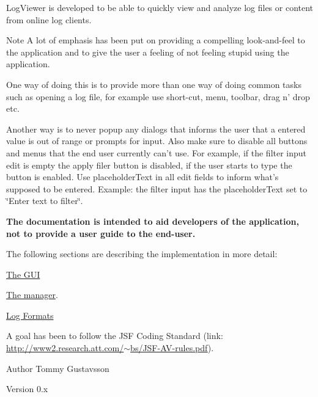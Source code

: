 Log\-Viewer is developed to be able to quickly view and analyze log files or content from online log clients.

\begin{DoxyNote}{Note}
A lot of emphasis has been put on providing a compelling look-\/and-\/feel to the application and to give the user a feeling of not feeling stupid using the application.

One way of doing this is to provide more than one way of doing common tasks such as opening a log file, for example use short-\/cut, menu, toolbar, drag n' drop etc.

Another way is to never popup any dialogs that informs the user that a entered value is out of range or prompts for input. Also make sure to disable all buttons and menus that the end user currently can't use. For example, if the filter input edit is empty the apply filer button is disabled, if the user starts to type the button is enabled. Use placeholder\-Text in all edit fields to inform what's supposed to be entered. Example\-: the filter input has the placeholder\-Text set to \char`\"{}\-Enter text to filter\char`\"{}.
\end{DoxyNote}
{\bfseries  The documentation is intended to aid developers of the application, not to provide a user guide to the end-\/user. }

The following sections are describing the implementation in more detail\-:
\begin{DoxyItemize}
\item \hyperlink{_g_u_i}{The G\-U\-I}
\item \hyperlink{_log_manager}{The manager}.
\item \hyperlink{_log_formats}{Log Formats}
\end{DoxyItemize}

A goal has been to follow the J\-S\-F Coding Standard (link\-: \hyperlink{}{http\-://www2.\-research.\-att.\-com/$\sim$bs/\-J\-S\-F-\/\-A\-V-\/rules.\-pdf}).

\begin{DoxyAuthor}{Author}
Tommy Gustavsson 
\end{DoxyAuthor}
\begin{DoxyVersion}{Version}
0.\-x 
\end{DoxyVersion}
